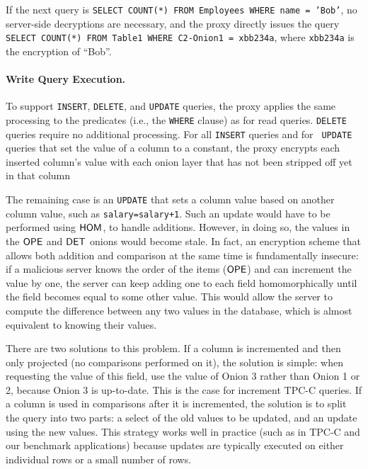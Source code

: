If the next query is {\tt SELECT COUNT(*) FROM Employees WHERE name =
  'Bob'}, no server-side decryptions are necessary, and the proxy
directly issues the query {\tt SELECT COUNT(*) FROM Table1 WHERE
  C2-Onion1 = xbb234a}, where \texttt{xbb234a} is the encryption of ``Bob''.



\paragraph{Write Query Execution.}

To support {\tt INSERT}, {\tt DELETE}, and {\tt UPDATE} queries, the
\name{} proxy applies the same processing to the predicates (i.e., the
{\tt WHERE} clause) as for read queries.  {\tt DELETE} queries require
no additional processing.  For all {\tt INSERT} queries and for {\tt
  UPDATE} queries that set the value of a column to a constant, the
proxy encrypts each inserted column's value with each onion layer that
has not been stripped off yet in that column

The remaining case is an {\tt UPDATE} that sets a column value based
on another column value, such as {\tt salary=salary+1}.  Such an
update would have to be performed using $\mathsf{HOM}$, to handle additions.
However, in doing so, the values in the $\mathsf{OPE}$ and $\mathsf{DET}$ onions would
become stale.  In fact, an encryption scheme that allows both addition
and comparison at the same time is fundamentally insecure: if a
malicious server knows the order of the items ($\mathsf{OPE}$) and can
increment the value by one, the server can keep adding one to each
field homomorphically until the field becomes equal to some other
value.  This would allow the server to compute the difference between
any two values in the database, which is almost equivalent to knowing
their values.

There are two solutions to this problem.  If a column is incremented
and then only projected (no comparisons performed on it), the solution
is simple: when requesting the value of this field, use the value of
Onion 3 rather than Onion 1 or 2, because Onion 3 is up-to-date.  This
is the case for increment TPC-C queries.
If a column is used in comparisons after it is
incremented, the solution is to split the query into two parts:
a select of the old values to be updated, and an update using
the new values. 
This strategy works well in practice (such as in TPC-C and our benchmark
applications) because updates are typically executed on either individual
rows or a small number of rows.


